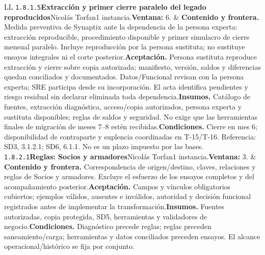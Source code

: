\begin{longtable}{L{\tabcolsep\relax}L{\tabcolsep\relax}}
\texttt{1.\allowbreak{}8.\allowbreak{}1.\allowbreak{}5}\newline{}\textbf{Extracción y primer cierre paralelo del legado reproducidos}\newline{}Nicolás Torfan\newline{}1 instancia.\newline{}\textbf{Ventana:} 6. & \textbf{Contenido y frontera.} Medida preventiva de Synaptix ante la dependencia de la persona experta: extracción reproducible, procedimiento disponible y primer simulacro de cierre mensual paralelo. Incluye reproducción por la persona sustituta; no sustituye ensayos integrales ni el corte posterior.\newline{}\textbf{Aceptación.} Persona sustituta reproduce extracción y cierre sobre copia autorizada; manifiesto, versión, saldos y diferencias quedan conciliados y documentados. Datos/Funcional revisan con la persona experta; SRE participa desde su incorporación. El acta identifica pendientes y riesgo residual sin declarar eliminada toda dependencia.\newline{}\textbf{Insumos.} Catálogo de fuentes, extracción diagnóstica, acceso/copia autorizados, persona experta y sustituta disponibles; reglas de saldos y seguridad. No exige que las herramientas finales de migración de meses 7--8 estén recibidas.\newline{}\textbf{Condiciones.} Cierre en mes 6; disponibilidad de contraparte y suplencia coordinadas en T-15/T-16. Referencia: SD3, 3.1.2.1; SD6, 6.1.1. No es un plazo impuesto por las bases.\\\hline
\texttt{1.\allowbreak{}8.\allowbreak{}2.\allowbreak{}1}\newline{}\textbf{Reglas: Socios y armadores}\newline{}Nicolás Torfan\newline{}1 instancia.\newline{}\textbf{Ventana:} 3. & \textbf{Contenido y frontera.} Correspondencia de origen/destino, claves, relaciones y reglas de Socios y armadores. Excluye el esfuerzo de los ensayos completos y del acompañamiento posterior.\newline{}\textbf{Aceptación.} Campos y vínculos obligatorios cubiertos; ejemplos válidos, ausentes e inválidos, autoridad y decisión funcional registrados antes de implementar la transformación.\newline{}\textbf{Insumos.} Fuentes autorizadas, copia protegida, SD5, herramientas y validadores de negocio.\newline{}\textbf{Condiciones.} Diagnóstico precede reglas; reglas preceden saneamiento/carga; herramientas y datos conciliados preceden ensayos. El alcance operacional/histórico se fija por conjunto.\\\hline

\end{longtable}
